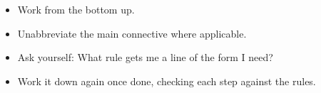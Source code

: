 \documentclass[../../include/open-logic-section]{subfiles}
\begin{document}
\begin{itemize}
	\item Work from the bottom up.
	\item Unabbreviate the main connective where applicable.
	\item Ask yourself: What rule gets me a line of the form I need?
	\item Work it down again once done, checking each step against the rules.
\end{itemize}
\end{document}
